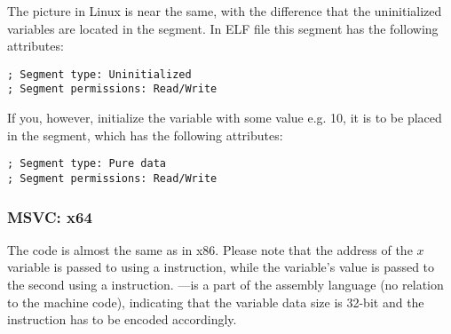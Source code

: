 The picture in Linux is near the same, with the difference that the uninitialized variables are located in the  segment. 
In \ac{ELF} file this segment has the following attributes:

\begin{lstlisting}
; Segment type: Uninitialized
; Segment permissions: Read/Write
\end{lstlisting}

If you, however, initialize the variable with some value e.g. 10, 
it is to be placed in the  segment, which has the following attributes:

\begin{lstlisting}
; Segment type: Pure data
; Segment permissions: Read/Write
\end{lstlisting}

\subsubsection{MSVC: x64}



The code is almost the same as in x86.
Please note that the address of the $x$ variable is passed to  using a \LEA instruction,
while the variable's value is passed to the second \printf using a \MOV instruction.
---is a part of the assembly language (no relation to the machine code),
indicating that the variable data size is 32-bit and the \MOV instruction has to be encoded accordingly.

